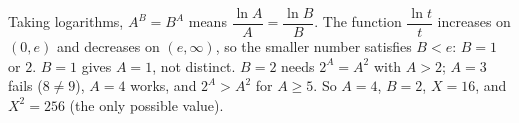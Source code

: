 Taking logarithms, $A^B=B^A$ means $\dfrac{\ln A}{A}=\dfrac{\ln B}{B}$. The function $\dfrac{\ln t}{t}$ increases on $(0,e)$ and decreases on $(e,\infty)$, so the smaller number satisfies $B<e$: $B=1$ or $2$. $B=1$ gives $A=1$, not distinct. $B=2$ needs $2^A=A^2$ with $A>2$; $A=3$ fails ($8\ne9$), $A=4$ works, and $2^A>A^2$ for $A\ge5$. So $A=4$, $B=2$, $X=16$, and $X^2=\boxed{256}$ (the only possible value).
